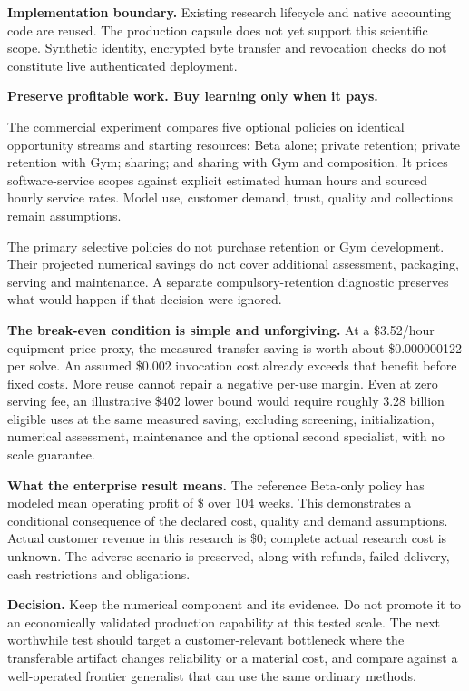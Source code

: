 \documentclass[11pt,letterpaper]{article}
\newcommand{\usd}[1]{\$#1}
\begin{document}
\textbf{Implementation boundary.} Existing research lifecycle and native accounting code are reused. The production capsule does not yet support this scientific scope. Synthetic identity, encrypted byte transfer and revocation checks do not constitute live authenticated deployment.

\newpage
{\Large\sffamily\bfseries\color{navy}Preserve profitable work. Buy learning only when it pays.}\par

The commercial experiment compares five optional policies on identical opportunity streams and starting resources: Beta alone; private retention; private retention with Gym; sharing; and sharing with Gym and composition. It prices software-service scopes against explicit estimated human hours and sourced hourly service rates. Model use, customer demand, trust, quality and collections remain assumptions.

\begin{center}\small\end{center}

The primary selective policies do not purchase retention or Gym development. Their projected numerical savings do not cover additional assessment, packaging, serving and maintenance. A separate compulsory-retention diagnostic preserves what would happen if that decision were ignored.

\textbf{The break-even condition is simple and unforgiving.} At a \usd{3.52}/hour equipment-price proxy, the measured transfer saving is worth about \usd{0.000000122} per solve. An assumed \usd{0.002} invocation cost already exceeds that benefit before fixed costs. More reuse cannot repair a negative per-use margin. Even at zero serving fee, an illustrative \usd{402} lower bound would require roughly 3.28 billion eligible uses at the same measured saving, excluding screening, initialization, numerical assessment, maintenance and the optional second specialist, with no scale guarantee.

\textbf{What the enterprise result means.} The reference Beta-only policy has modeled mean operating profit of \usd{\ReferenceProfit{}} over 104 weeks. This demonstrates a conditional consequence of the declared cost, quality and demand assumptions. Actual customer revenue in this research is \usd{0}; complete actual research cost is unknown. The adverse scenario is preserved, along with refunds, failed delivery, cash restrictions and obligations.

\textbf{Decision.} Keep the numerical component and its evidence. Do not promote it to an economically validated production capability at this tested scale. The next worthwhile test should target a customer-relevant bottleneck where the transferable artifact changes reliability or a material cost, and compare against a well-operated frontier generalist that can use the same ordinary methods.
\end{document}
